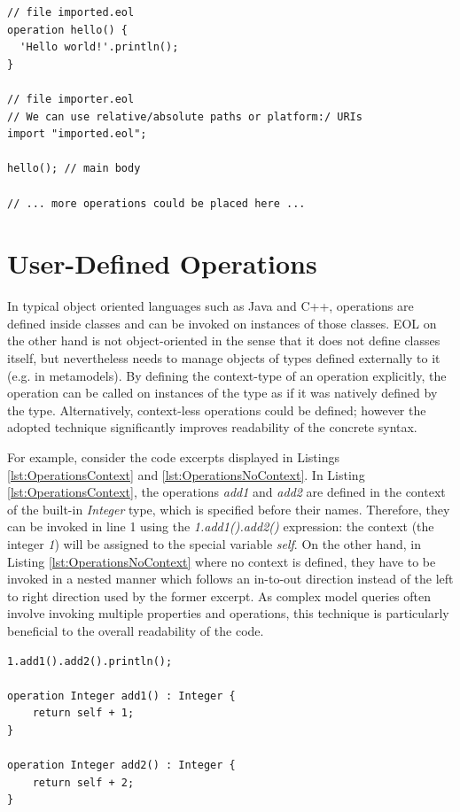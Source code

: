 \begin{lstlisting}[float, caption={Example of two related EOL modules}, label=lst:ExampleImports, language=EOL]
// file imported.eol
operation hello() {
  'Hello world!'.println();
}

// file importer.eol
// We can use relative/absolute paths or platform:/ URIs
import "imported.eol";

hello(); // main body

// ... more operations could be placed here ...
\end{lstlisting}

\section{User-Defined Operations}
\label{sec:Design.EOL.Operations}

In typical object oriented languages such as Java and C++, operations are defined inside classes and can be invoked on instances of those classes. EOL on the other hand is not object-oriented in the sense that it does not define classes itself, but nevertheless needs to manage objects of types defined externally to it (e.g. in metamodels). By defining the context-type of an operation explicitly, the operation can be called on instances of the type as if it was natively defined by the type. Alternatively, context-less operations could be defined; however the adopted technique significantly improves readability of the concrete syntax.

For example, consider the code excerpts displayed in Listings \ref{lst:OperationsContext} and \ref{lst:OperationsNoContext}. In Listing \ref{lst:OperationsContext}, the operations \emph{add1} and \emph{add2} are defined in the context of the built-in \emph{Integer} type, which is specified before their names. Therefore, they can be invoked in line 1 using the \emph{1.add1().add2()} expression: the context (the integer \emph{1}) will be assigned to the special variable \emph{self}. On the other hand, in Listing \ref{lst:OperationsNoContext} where no context is defined, they have to be invoked in a nested manner which follows an in-to-out direction instead of the left to right direction used by the former excerpt. As complex model queries often involve invoking multiple properties and operations, this technique is particularly beneficial to the overall readability of the code.

\begin{lstlisting}[float=tbp, caption={Context-defining EOL operations}, label=lst:OperationsContext, language=EOL]
1.add1().add2().println();

operation Integer add1() : Integer {
	return self + 1;
}

operation Integer add2() : Integer {
	return self + 2;
}
\end{lstlisting}

